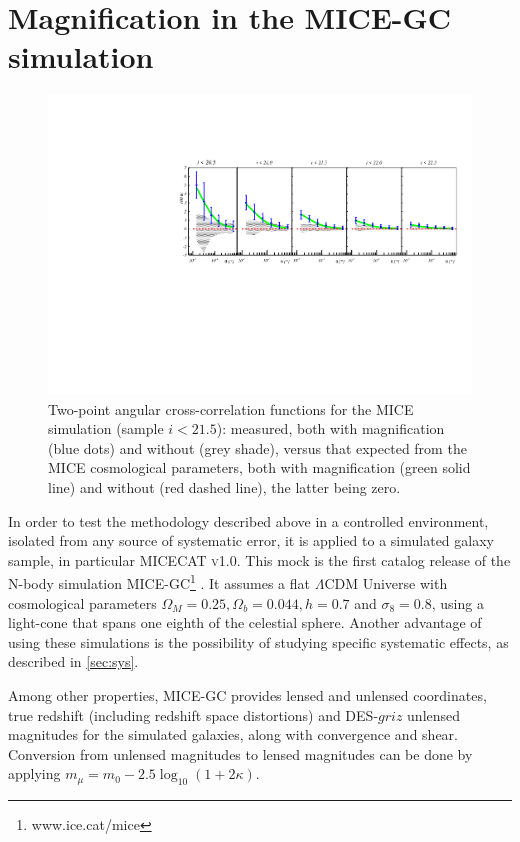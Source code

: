 \section{Magnification in the MICE-GC simulation}
\label{sec:mice}
\begin{figure}
\includegraphics[width=\textwidth,trim={0 2.3cm 0 3.5cm},clip]{./figures/mag_i_MICE.pdf}
\caption{Two-point angular cross-correlation functions for the MICE simulation (sample $i < 21.5$): measured, both with magnification (blue dots) and without (grey shade), versus that expected from the MICE cosmological parameters, both with magnification (green solid line) and without (red dashed line), the latter being zero.}
\label{fig:MICE}
\end{figure}
In order to test the methodology described above in a controlled environment, isolated from any source of systematic error, it is applied to a simulated galaxy sample, in particular {\scshape MICECAT v1.0}.
This mock is the first catalog release of the N-body simulation MICE-GC\footnote{www.ice.cat/mice} \cite{2015MNRAS.447.1319F,2015.2987F,2015MNRAS.453.1513C}. It assumes a flat $\Lambda$CDM Universe with cosmological parameters $\Omega_M=0.25, \Omega_b=0.044, h=0.7$ and $\sigma_8 = 0.8$, using a light-cone that spans one eighth of the celestial sphere. Another advantage of using these simulations is the possibility of studying specific systematic effects, as described in \autoref{sec:sys}.

Among other properties, MICE-GC provides lensed and unlensed coordinates, true redshift (including redshift space distortions) and DES-$griz$ unlensed magnitudes for the simulated galaxies, along with convergence and shear.
Conversion from unlensed magnitudes to lensed magnitudes can be done by applying $m_\mu = m_0-2.5\log_{10}(1+2\kappa)$.

